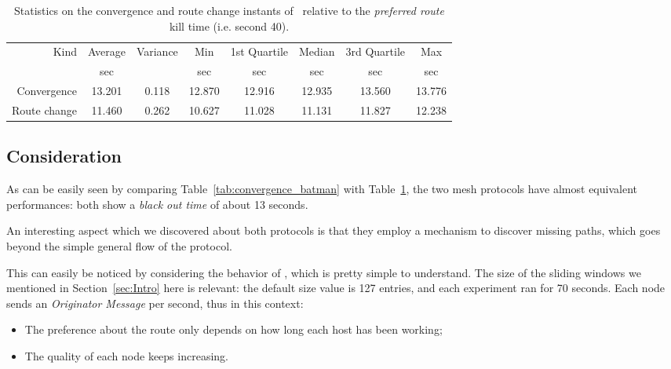        \begin{table}[htbp]
            \centering
            \begin{tabular}{rccccccc}
            \toprule
            Kind & Average & Variance & Min & 1st Quartile &
            Median & 3rd Quartile & Max \\
            & \footnotesize{sec} & & \footnotesize{sec} & \footnotesize{sec} &
            \footnotesize{sec} & \footnotesize{sec} & \footnotesize{sec} \\
            \midrule
            Convergence & 13.201 & 0.118 & 12.870 & 12.916 & 12.935 & 13.560 &13.776 \\
            Route change & 11.460 & 0.262 & 10.627 & 11.028 & 11.131 &11.827 & 12.238 \\
            \bottomrule
            \end{tabular}
            \caption{Statistics on the convergence and route change
              instants of \olsr\ relative to the \emph{preferred
                route} kill time (i.e. second 40).}
           \label{tab:convergence_olsr}
        \end{table}

\subsection{Consideration}

As can be easily seen by comparing Table~\ref{tab:convergence_batman}
with Table~\ref{tab:convergence_olsr}, the two mesh protocols
have almost equivalent performances: both show a
\emph{black out time} of about 13 seconds.

%

An interesting aspect which we discovered about both protocols is that
they employ a mechanism to discover missing paths, which goes
beyond the simple general flow of the protocol.

This can easily be noticed by considering the behavior of \batman, which
is pretty simple to understand. The size of the sliding windows we
mentioned in Section~\ref{sec:Intro} here is relevant: the default size
value is 127 entries, and each experiment ran for 70 seconds. Each node
sends an \emph{Originator Message} per second, thus in this context:
\begin{itemize}
\item   The preference about the route only depends on how long each host
        has been working;
\item   The quality of each node keeps increasing.
\end{itemize}

